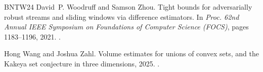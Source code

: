 \documentclass[11pt]{article}
\begin{document}
\begin{thebibliography}{BNTW24}
David~P. Woodruff and Samson Zhou.
\newblock Tight bounds for adversarially robust streams and sliding windows via
  difference estimators.
\newblock In {\em Proc. 62nd Annual IEEE Symposium on Foundations of Computer
  Science (FOCS)}, pages 1183--1196, 2021.
\newblock \href {https://doi.org/10.1109/FOCS52979.2021.00116}
  {}.

Hong Wang and Joshua Zahl.
\newblock Volume estimates for unions of convex sets, and the {K}akeya set
  conjecture in three dimensions, 2025.
\newblock \href {https://arxiv.org/abs/2502.17655} {}.

\end{thebibliography}
\end{document}
